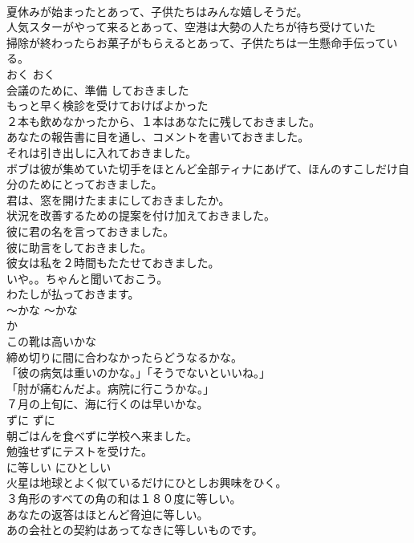 \documentclass[8pt]{extreport}
\begin{document}
\begin{CJK}{UTF8}{min}
\\	夏休みが始まったとあって、子供たちはみんな嬉しそうだ。  
\\	人気スターがやって来るとあって、空港は大勢の人たちが待ち受けていた  
\\	掃除が終わったらお菓子がもらえるとあって、子供たちは一生懸命手伝っている。  
\\	おく	おく	
\\	会議のために、準備 しておきました  
\\	もっと早く検診を受けておけばよかった  
\\	２本も飲めなかったから、１本はあなたに残しておきました。   
\\	あなたの報告書に目を通し、コメントを書いておきました。   
\\	それは引き出しに入れておきました。   
\\	ボブは彼が集めていた切手をほとんど全部ティナにあげて、ほんのすこしだけ自分のためにとっておきました。   
\\	君は、窓を開けたままにしておきましたか。  
\\	状況を改善するための提案を付け加えておきました。   
\\	彼に君の名を言っておきました。   
\\	彼に助言をしておきました。   
\\	彼女は私を２時間もたたせておきました。   
\\	いや。。ちゃんと聞いておこう。  
\\	わたしが払っておきます。  
\\	〜かな	〜かな	
\\	か 
\\	この靴は高いかな   
\\	締め切りに間に合わなかったらどうなるかな。  
\\	「彼の病気は重いのかな。」「そうでないといいね。」  
\\	「肘が痛むんだよ。病院に行こうかな。」  
\\	７月の上旬に、海に行くのは早いかな。  
\\	ずに	ずに	
\\	朝ごはんを食べずに学校へ来ました。  
\\	勉強せずにテストを受けた。  
\\	に等しい	にひとしい	
\\	火星は地球とよく似ているだけにひとしお興味をひく。   
\\	３角形のすべての角の和は１８０度に等しい。   
\\	あなたの返答はほとんど脅迫に等しい。   
\\	あの会社との契約はあってなきに等しいものです。   

\end{CJK}
\end{document}
